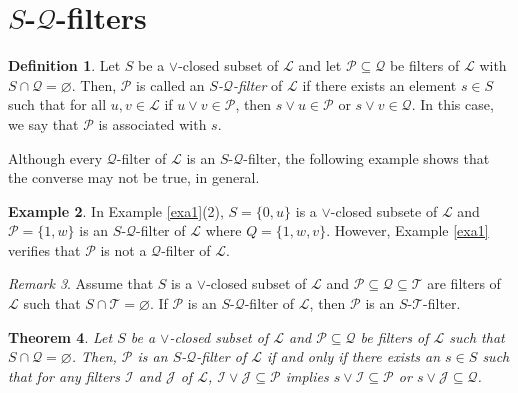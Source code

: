 \documentclass[preprint,review,10pt]{amsart}
\newtheorem{theorem}{Theorem}[section]
\theoremstyle{definition}
\newtheorem{definition}[theorem]{Definition}
\newtheorem{example}[theorem]{Example}
\theoremstyle{remark}
\newtheorem{remark}[theorem]{Remark}
\numberwithin{equation}{section}
\begin{document}
\section{$S$-$\mathcal{Q}$-filters}
\begin{definition}
Let $S$ be a $\vee$-closed subset of $\mathcal{L}$ and let $\mathcal{P} \subseteq \mathcal{Q}$ be filters of $\mathcal{L}$ with $S \cap \mathcal{Q}=\varnothing$. Then, $\mathcal{P}$ is called an {\it $S$-$\mathcal{Q}$-filter} of  $\mathcal{L}$ if there exists an element $s \in S$ such that for all $u,v \in \mathcal{L}$ if $u \vee v \in \mathcal{P}$, then $s \vee u \in \mathcal{P}$ or $s \vee v \in \mathcal{Q}$. In this case, we say that $\mathcal{P}$ is associated with $s$.
\end{definition}
Although every $\mathcal{Q}$-filter of $\mathcal{L}$ is an $S$-$\mathcal{Q}$-filter, the following example shows that the converse   may not be true, in general.
\begin{example} \label{exasq}
In Example \ref{exa1}(2), $S=\{0,u\}$ is a $\vee$-closed subsete of $\mathcal{L}$ and $\mathcal{P}=\{1,w\}$ is an $S$-$\mathcal{Q}$-filter of $\mathcal{L}$ where $Q=\{1,w,v\}$. However, Example \ref{exa1} verifies that $\mathcal{P}$ is not a $\mathcal{Q}$-filter of $\mathcal{L}$.
\end{example} 
\begin{remark} \label{21}
Assume  that $S$ is a $\vee$-closed subset of $\mathcal{L}$ and  $\mathcal{P} \subseteq \mathcal{Q} \subseteq \mathcal{T}$ are filters of $\mathcal{L}$ such that  $S \cap \mathcal{T}=\varnothing$. If $\mathcal{P}$ is an $S$-$\mathcal{Q}$-filter of $\mathcal{L}$, then $\mathcal{P}$ is an $S$-$\mathcal{T}$-filter.
\end{remark}
\begin{theorem} \label{22}
Let $S$ be a $\vee$-closed subset of $\mathcal{L}$ and  $\mathcal{P} \subseteq \mathcal{Q}$ be filters of $\mathcal{L}$ such that  $S \cap \mathcal{Q}=\varnothing$. Then,  $\mathcal{P}$ is an  $S$-$\mathcal{Q}$-filter of $\mathcal{L}$ if and only if there exists an $s \in S$ such that 
 for any filters $\mathcal{I}$ and $\mathcal{J}$  of $\mathcal{L}$, $\mathcal{I} \vee \mathcal{J} \subseteq \mathcal{P}$ implies  $s \vee \mathcal{I}  \subseteq \mathcal{P} $ or $s \vee \mathcal{J} \subseteq \mathcal{Q}$.

\end{theorem}
\end{document}
